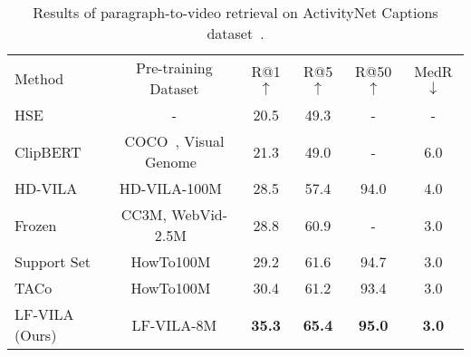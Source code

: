\documentclass{article}
\begin{document}
\begin{table}[t]
    \small
    \centering
    \caption{Results of paragraph-to-video retrieval on ActivityNet Captions dataset~\cite{krishna2017actnetcaption}.}
    \begin{tabular}{l c c c c c} 
    \toprule
    Method &Pre-training Dataset & R@1 $\uparrow$ & R@5 $\uparrow$ & R@50 $\uparrow$ & MedR $\downarrow$ \\
    \cmidrule{1-6}
    HSE~\cite{zhang2018hse} & - & 20.5 & 49.3 & - & -  \\
    ClipBERT~\cite{lei2021clipbert} & COCO~\cite{chen2015mscoco}, Visual Genome~\cite{krishna2017visualgenome} & 21.3 & 49.0& -& 6.0  \\
    HD-VILA~\cite{xue2021hdvila}  &HD-VILA-100M~\cite{xue2021hdvila}  & 28.5 & 57.4 & 94.0 & 4.0 \\
    Frozen~\cite{bain2021frozen} &CC3M, WebVid-2.5M~\cite{bain2021frozen} &28.8 &60.9 &- & 3.0 \\
    Support Set~\cite{patrick2020support}  &HowTo100M~\cite{miech2019howto100m} & 29.2 & 61.6 & 94.7 & 3.0 \\
    TACo~\cite{yang2021taco} &HowTo100M~\cite{miech2019howto100m} & 30.4  & 61.2 & 93.4 & 3.0 \\
    \cmidrule{1-6}
    LF-VILA (Ours)  &LF-VILA-8M & \textbf{35.3} & \textbf{65.4}&  \textbf{95.0} & \textbf{3.0} \\ 
    \bottomrule
    \end{tabular}
\label{tab:actnetret}
\end{table}
\end{document}
